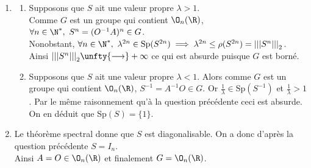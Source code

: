 \documentclass[8pt]{book}
\begin{document}
\begin{enumerate}[leftmargin=*]
\begin{itemize}
		\end{itemize}
		$\O_n(\R)$ est un fermé borné de $\M_n(\R)$ qui est de dimension finie, c'est donc un compact.
		\item \begin{enumerate}[label=\alph*.]
			\item Supposons que $S$ ait une valeur propre $\lambda>1$.\\
			Comme $G$ est un groupe qui contient $\O_n(\R)$, $\forall n\in \N^*,\ S^n=(O^{-1}A)^n\in G$.\\
			Nonobstant, $\forall n\in \N^*,\ \lambda^{2n}\in \text{Sp}(S^{2n})\implies \lambda^{2n}\leq \rho(S^{2n})={|||S^n|||}_2$. Ainsi ${|||S^n|||}_2\unfty{\longrightarrow}+\infty$ ce qui est absurde puisque $G$ est borné.
			\item Supposons que $S$ ait une valeur propre $\lambda<1$. Alors comme $G$ est un groupe qui contient $\O_n(\R)$, $S^{-1}=A^{-1}O\in G$. Or $\displaystyle\frac{1}{\lambda}\in \text{Sp}(S^{-1})$ et $\displaystyle\frac{1}{\lambda}>1$. Par le même raisonnement qu'à la question précédente ceci est absurde. On en déduit que Sp$(S)=\{1\}$.
		\end{enumerate}
		\item Le théorème spectral donne que $S$ est diagonalisable. On a donc d'après la question précédente $S=I_n$.\\
		Ainsi $A=O\in \O_n(\R)$ et finalement $G=\O_n(\R)$.
	\end{enumerate}
	
\end{document}
